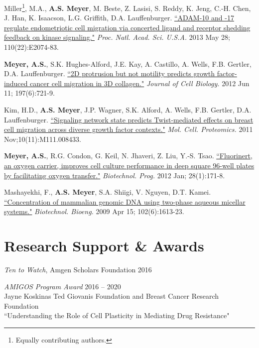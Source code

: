 \documentclass[11pt]{res}
\begin{document}
\begin{resume}
{Miller\footnote{Equally contributing authors.}, M.A., {\bf A.S. Meyer}\footnotemark[\value{footnote}], M. Beste, Z. Lasisi, S. Reddy, K. Jeng, C.-H. Chen, J. Han, K. Isaacson, L.G. Griffith, D.A. Lauffenburger. \href{http://www.ncbi.nlm.nih.gov/pubmed/23674691}{``ADAM-10 and -17 regulate endometriotic cell migration via concerted ligand and receptor shedding feedback on kinase signaling."} {\sl Proc. Natl. Acad. Sci. U.S.A.} 2013 May 28; 110(22):E2074-83.

{\bf Meyer, A.S.}, S.K. Hughes-Alford, J.E. Kay, A. Castillo, A. Wells, F.B. Gertler, D.A. Lauffenburger. \href{http://www.ncbi.nlm.nih.gov/pubmed/22665521}{``2D protrusion but not motility predicts growth factor-induced cancer cell migration in 3D collagen."} {\sl Journal of Cell Biology.} 2012 Jun 11; 197(6):721-9.

Kim, H.D., {\bf A.S. Meyer}, J.P. Wagner, S.K. Alford, A. Wells, F.B. Gertler, D.A. Lauffenburger. \href{http://www.ncbi.nlm.nih.gov/pubmed/21832255}{``Signaling network state predicts Twist-mediated effects on breast cell migration across diverse growth factor contexts."} {\sl Mol. Cell. Proteomics.} 2011 Nov;10(11):M111.008433.

{\bf Meyer, A.S.}, R.G. Condon, G. Keil, N. Jhaveri, Z. Liu, Y.-S. Tsao.  \href{http://www.ncbi.nlm.nih.gov/pubmed/21954223}{``Fluorinert, an oxygen carrier, improves cell culture performance in deep square 96-well plates by facilitating oxygen transfer."} {\sl Biotechnol. Prog.} 2012 Jan; 28(1):171-8.

Mashayekhi, F., {\bf A.S. Meyer}, S.A. Shiigi, V. Nguyen, D.T. Kamei. \href{http://www.ncbi.nlm.nih.gov/pubmed/19061237}{``Concentration of mammalian genomic DNA using two-phase aqueous micellar systems."} {\sl Biotechnol. Bioeng.} 2009 Apr 15; 102(6):1613-23.

}


\clearpage
\section{Research Support \& Awards}

\emph{Ten to Watch}, Amgen Scholars Foundation \hfill 2016

{\sl AMIGOS Program Award} \hfill 2016 -- 2020 \\
Jayne Koskinas Ted Giovanis Foundation and Breast Cancer Research Foundation\\
``Understanding the Role of Cell Plasticity in Mediating Drug Resistance"


\end{resume}
\end{document}
